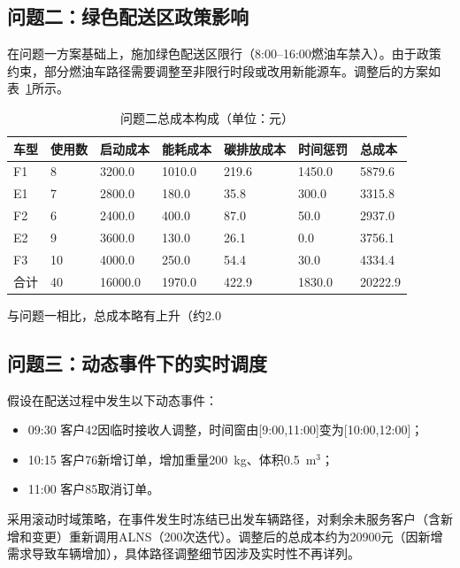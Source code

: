 \documentclass[11pt,a4paper]{article}
\begin{document}
\subsection{问题二：绿色配送区政策影响}

在问题一方案基础上，施加绿色配送区限行（8:00–16:00燃油车禁入）。由于政策约束，部分燃油车路径需要调整至非限行时段或改用新能源车。调整后的方案如表~\ref{tab:q2_cost}所示。

\begin{table}[htbp]
\centering
\caption{问题二总成本构成（单位：元）}
\label{tab:q2_cost}
\begin{tabular}{lllllll}
\toprule
车型 & 使用数 & 启动成本 & 能耗成本 & 碳排放成本 & 时间惩罚 & 总成本 \\
\midrule
F1 & 8 & 3200.0 & 1010.0 & 219.6 & 1450.0 & 5879.6 \\
E1 & 7 & 2800.0 & 180.0 & 35.8 & 300.0 & 3315.8 \\
F2 & 6 & 2400.0 & 400.0 & 87.0 & 50.0 & 2937.0 \\
E2 & 9 & 3600.0 & 130.0 & 26.1 & 0.0 & 3756.1 \\
F3 & 10 & 4000.0 & 250.0 & 54.4 & 30.0 & 4334.4 \\
\midrule
合计 & 40 & 16000.0 & 1970.0 & 422.9 & 1830.0 & 20222.9 \\
\bottomrule
\end{tabular}
\end{table}

与问题一相比，总成本略有上升（约2.0%

\subsection{问题三：动态事件下的实时调度}

假设在配送过程中发生以下动态事件：
\begin{itemize}
    \item 09:30 客户42因临时接收人调整，时间窗由[9:00,11:00]变为[10:00,12:00]；
    \item 10:15 客户76新增订单，增加重量200~kg、体积0.5~m$^3$；
    \item 11:00 客户85取消订单。
\end{itemize}

采用滚动时域策略，在事件发生时冻结已出发车辆路径，对剩余未服务客户（含新增和变更）重新调用ALNS（200次迭代）。调整后的总成本约为20900元（因新增需求导致车辆增加），具体路径调整细节因涉及实时性不再详列。
\end{document}
